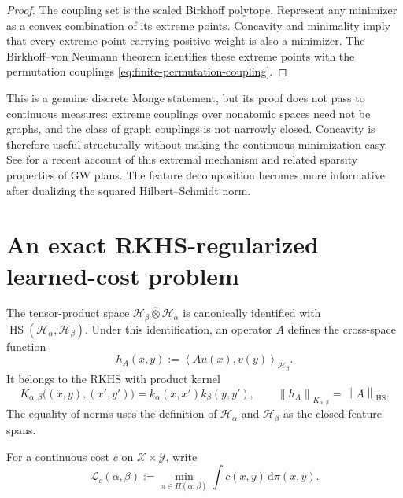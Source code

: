 \documentclass[11pt,a4paper]{article}
\theoremstyle{definition}
\theoremstyle{remark}
\newcommand{\Hcal}{\mathcal H}
\newcommand{\Lcal}{\mathcal L}
\newcommand{\Piopt}{\Pi}
\newcommand{\HS}{\operatorname{HS}}
\newcommand{\dd}{\,\mathrm d}
\newcommand{\norm}[1]{\left\lVert #1\right\rVert}
\newcommand{\ip}[2]{\left\langle #1,#2\right\rangle}
\begin{document}
\begin{proof}
The coupling set is the scaled Birkhoff polytope.  Represent any minimizer as
a convex combination of its extreme points.  Concavity and minimality imply
that every extreme point carrying positive weight is also a minimizer.  The
Birkhoff--von Neumann theorem identifies these extreme points with the
permutation couplings \eqref{eq:finite-permutation-coupling}.
\end{proof}

This is a genuine discrete Monge statement, but its proof does not pass to
continuous measures: extreme couplings over nonatomic spaces need not be
graphs, and the class of graph couplings is not narrowly closed.  Concavity
is therefore useful structurally without making the continuous minimization
easy.  See \citet{Vayer2026Sparsity} for a recent account of this extremal
mechanism and related sparsity properties of GW plans.  The feature
decomposition becomes more informative after dualizing the squared
Hilbert--Schmidt norm.

\section{An exact RKHS-regularized learned-cost problem}
\label{sec:learned-cost}

The tensor-product space
\(
 \Hcal_\beta\widehat\otimes\Hcal_\alpha
\)
is canonically identified with
\(\HS(\Hcal_\alpha,\Hcal_\beta)\).  Under this identification, an operator
\(A\) defines the cross-space function
\begin{equation}
  h_A(x,y):=\ip{Au(x)}{v(y)}_{\Hcal_\beta}.
  \label{eq:tensor-rkhs-function}
\end{equation}
It belongs to the RKHS with product kernel
\begin{equation}
  K_{\alpha,\beta}\bigl((x,y),(x',y')\bigr)
  =k_\alpha(x,x')k_\beta(y,y'),
  \qquad
  \norm{h_A}_{K_{\alpha,\beta}}=\norm{A}_{\HS}.
  \label{eq:tensor-rkhs-kernel}
\end{equation}
The equality of norms uses the definition of \(\Hcal_\alpha\) and
\(\Hcal_\beta\) as the closed feature spans.

For a continuous cost \(c\) on \(\mathcal X\times\mathcal Y\), write
\begin{equation}
  \Lcal_c(\alpha,\beta)
  :=\min_{\pi\in\Piopt(\alpha,\beta)}\int c(x,y)\dd\pi(x,y).
  \label{eq:linear-ot-value}
\end{equation}
\end{document}
